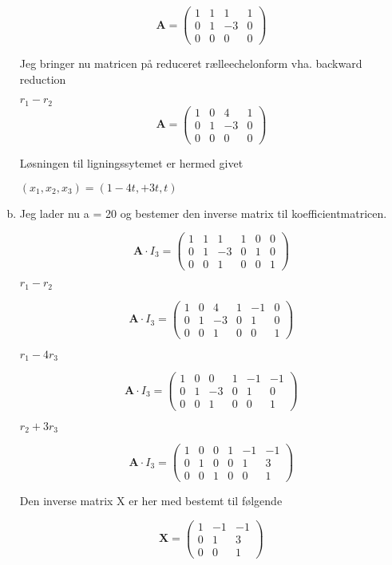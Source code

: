 \documentclass[12pt]{article}
\begin{document}
\begin{enumerate}[(a)]
$$
\mathbf A=
\left(\begin{array}{cccc}
1&1&1&1
\\
0&1&-3&0
\\
0&0&0&0
\end{array}\right)
$$

Jeg bringer nu matricen på reduceret rælleechelonform vha. backward reduction
	
	$	r_{1} - r_{2}$
$$
\mathbf A=
\left(\begin{array}{cccc}
1&0&4&1
\\
0&1&-3&0
\\
0&0&0&0
\end{array}\right)
$$

Løsningen til ligningssytemet er hermed givet
 
	$	(x_{1}, x_{2}, x_{3}) = (1-4t, +3t, t)$

\item
Jeg lader nu a = 20 og bestemer den inverse matrix til koefficientmatricen.


$$
\mathbf A \cdot I_{3} =
\left(\begin{array}{ccc|ccc}
1&1&1&1&0&0
\\
0&1&-3&0&1&0
\\
0&0&1&0&0&1
\end{array}\right)
$$

$	r_{1} - r_{2}$

$$
\mathbf A \cdot I_{3} =
\left(\begin{array}{ccc|ccc}
1&0&4&1&-1&0
\\
0&1&-3&0&1&0
\\
0&0&1&0&0&1
\end{array}\right)
$$

$	r_{1} - 4r_{3}$

$$
\mathbf A \cdot I_{3} =
\left(\begin{array}{ccc|ccc}
1&0&0&1&-1&-1
\\
0&1&-3&0&1&0
\\
0&0&1&0&0&1
\end{array}\right)
$$

$	r_{2} + 3r_{3}$

$$
\mathbf A \cdot I_{3} =
\left(\begin{array}{ccc|ccc}
1&0&0&1&-1&-1
\\
0&1&0&0&1&3
\\
0&0&1&0&0&1
\end{array}\right)
$$

Den inverse matrix X er her med bestemt til følgende


$$
\mathbf X =
\left(\begin{array}{ccc}
1&-1&-1
\\
0&1&3
\\
0&0&1
\end{array}\right)
$$
\end{enumerate}
\newpage
\end{document}
